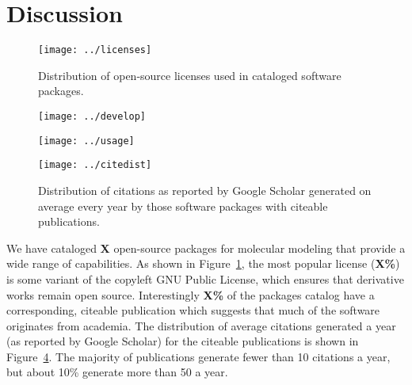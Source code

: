 \section{Discussion}

\begin{figure}
\centering 
\texttt{[image: ../licenses]}
\caption{\label{licenses} Distribution of open-source licenses used in cataloged software packages.}
\end{figure}

\begin{figure*}
\centering
\begin{subfigure}[t]{.4\linewidth}
\centering \label{develop}
\texttt{[image: ../develop]}
\end{subfigure}
\hfill
\begin{subfigure}[t]{.4\linewidth}
\centering \label{usage}
\texttt{[image: ../usage]}
\end{subfigure}
\caption{\label{pies} Activity distributions of cataloged software packages.
 Distribution of development activity.  Distribution of user activity.
}
\end{figure*}

\begin{figure}
\centering 
\texttt{[image: ../citedist]}
\caption{\label{cites} Distribution of citations as reported by Google Scholar generated on average every year by those software packages with citeable publications.}
\end{figure}


We have cataloged \textbf{X} open-source packages for molecular modeling that provide a wide range of capabilities.  As shown in Figure~\ref{licenses}, the most popular license (\textbf{X\%}) is some variant of the copyleft GNU Public License, which ensures that derivative works remain open source.  Interestingly \textbf{X\%} of the packages catalog have a corresponding, citeable publication which suggests that much of the software originates from academia.   The distribution of average citations generated a year (as reported by Google Scholar) for the citeable publications is shown in Figure~\ref{cites}.  The majority of publications generate fewer than 10 citations a year, but about 10\% generate more than 50 a year.

